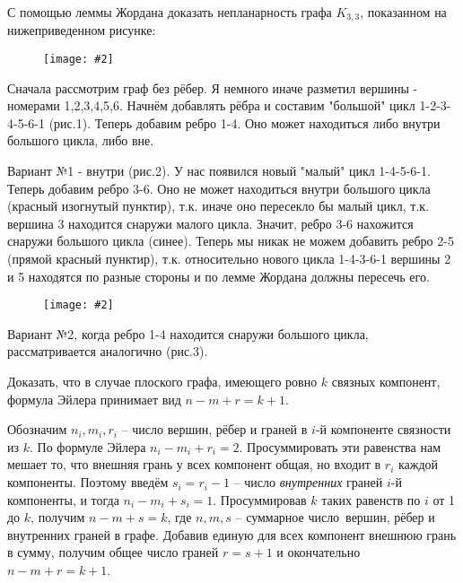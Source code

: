 \documentclass[a4paper,12pt]{article}
\numberwithin{figure}{section}
\newcommand\CenterFigure[2]{
	\begin{figure}[H]
		\centering
		\texttt{[image: \#2]}
	\end{figure}
}
\begin{document}
\begin{problem}
	С помощью леммы Жордана доказать непланарность графа $K_{3,3}$, показанном на нижеприведенном рисунке:
		\CenterFigure{4cm}{planar1-step10-why-k33-nonplanar.png}
\end{problem}
\begin{solution}
	Сначала рассмотрим граф без рёбер. Я немного иначе разметил вершины - номерами 1,2,3,4,5,6. Начнём добавлять рёбра и составим "большой" цикл 1-2-3-4-5-6-1 (рис.1). Теперь добавим ребро 1-4. Оно может находиться либо внутри большого цикла, либо вне.
	
	Вариант №1 - внутри (рис.2). У нас появился новый "малый" цикл 1-4-5-6-1. Теперь добавим ребро 3-6. Оно не может находиться внутри большого цикла (красный изогнутый пунктир), т.к. иначе оно пересекло бы малый цикл, т.к. вершина 3 находится снаружи малого цикла. Значит, ребро 3-6 нахожится снаружи большого цикла (синее). Теперь мы никак не можем добавить ребро 2-5 (прямой красный пунктир), т.к. относительно нового цикла 1-4-3-6-1 вершины 2 и 5 находятся по разные стороны и по лемме Жордана должны пересечь его.
		\CenterFigure{14cm}{planar1-step10-solution.png}
	Вариант №2, когда ребро 1-4 находится снаружи большого цикла, рассматривается аналогично (рис.3).
\end{solution}



\begin{problem}
	Доказать, что в случае плоского графа, имеющего ровно $k$ связных компонент, формула Эйлера принимает вид $n-m+r=k+1$.
\end{problem}
\begin{solution}
	Обозначим $n_i,m_i,r_i$ -- число вершин, рёбер и граней в $i$-й компоненте связности из $k$. По формуле Эйлера $n_i-m_i+r_i=2$. Просуммировать эти равенства нам мешает то, что внешняя грань у всех компонент общая, но входит в $r_i$ каждой компоненты. Поэтому введём $s_i=r_i-1$ -- число \textit{внутренних} граней $i$-й компоненты, и тогда $n_i-m_i+s_i=1$. Просуммировав $k$ таких равенств по $i$ от 1 до $k$, получим $n-m+s=k$, где $n,m,s$ -- суммарное число вершин, рёбер и внутренних граней в графе. Добавив единую для всех компонент внешнюю грань в сумму, получим общее число граней $r=s+1$ и окончательно $n-m+r=k+1$.
\end{solution}
\end{document}

